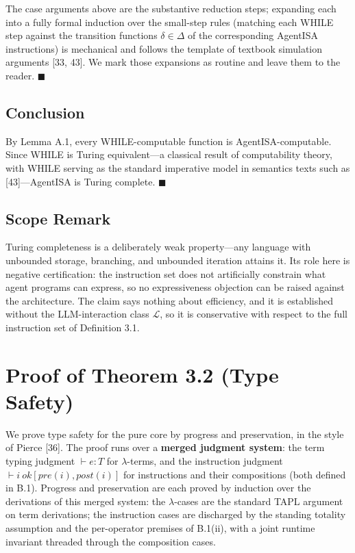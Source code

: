 \documentclass[
  11pt,
]{article}
\begin{document}
The case arguments above are the substantive reduction steps; expanding
each into a fully formal induction over the small-step rules (matching
each WHILE step against the transition functions \(\delta \in \Delta\)
of the corresponding AgentISA instructions) is mechanical and follows
the template of textbook simulation arguments {[}33, 43{]}. We mark
those expansions as routine and leave them to the reader.
\(\blacksquare\)

\subsection{Conclusion}\label{conclusion}

By Lemma A.1, every WHILE-computable function is AgentISA-computable.
Since WHILE is Turing equivalent---a classical result of computability
theory, with WHILE serving as the standard imperative model in semantics
texts such as {[}43{]}---AgentISA is Turing complete. \(\blacksquare\)

\subsection{Scope Remark}\label{scope-remark}

Turing completeness is a deliberately weak property---any language with
unbounded storage, branching, and unbounded iteration attains it. Its
role here is negative certification: the instruction set does not
artificially constrain what agent programs can express, so no
expressiveness objection can be raised against the architecture. The
claim says nothing about efficiency, and it is established without the
LLM-interaction class \(\mathcal{L}\), so it is conservative with
respect to the full instruction set of Definition 3.1.

\section{Proof of Theorem 3.2 (Type
Safety)}\label{proof-of-theorem-3.2-type-safety}

We prove type safety for the pure core by progress and preservation, in
the style of Pierce {[}36{]}. The proof runs over a \textbf{merged
judgment system}: the term typing judgment \(\vdash e : T\) for
\(\lambda\)-terms, and the instruction judgment
\(\vdash i\ \mathit{ok}[pre(i), post(i)]\) for instructions and their
compositions (both defined in B.1). Progress and preservation are each
proved by induction over the derivations of this merged system: the
\(\lambda\)-cases are the standard TAPL argument on term derivations;
the instruction cases are discharged by the standing totality assumption
and the per-operator premises of B.1(ii), with a joint runtime invariant
threaded through the composition cases.
\end{document}
